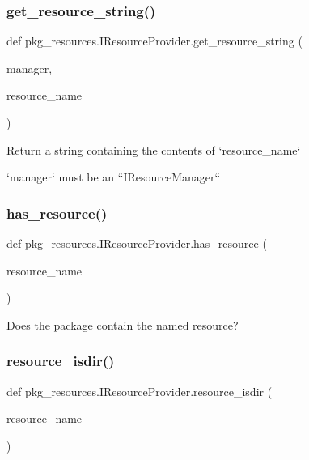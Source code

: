 \subsubsection{\texorpdfstring{get\+\_\+resource\+\_\+string()}{get\_resource\_string()}}
{\footnotesize\ttfamily def pkg\+\_\+resources.\+I\+Resource\+Provider.\+get\+\_\+resource\+\_\+string (\begin{DoxyParamCaption}\item[{}]{manager,  }\item[{}]{resource\+\_\+name }\end{DoxyParamCaption})}

\begin{DoxyVerb}Return a string containing the contents of `resource_name`

`manager` must be an ``IResourceManager``\end{DoxyVerb}
 \mbox{\label{classpkg__resources_1_1_i_resource_provider_a3be0ded1d6af19617ec116f70ea16320}} 
\subsubsection{\texorpdfstring{has\+\_\+resource()}{has\_resource()}}
{\footnotesize\ttfamily def pkg\+\_\+resources.\+I\+Resource\+Provider.\+has\+\_\+resource (\begin{DoxyParamCaption}\item[{}]{resource\+\_\+name }\end{DoxyParamCaption})}

\begin{DoxyVerb}Does the package contain the named resource?\end{DoxyVerb}
 \mbox{\label{classpkg__resources_1_1_i_resource_provider_a02156b99af212145832c8b41b9448499}} 
\subsubsection{\texorpdfstring{resource\+\_\+isdir()}{resource\_isdir()}}
{\footnotesize\ttfamily def pkg\+\_\+resources.\+I\+Resource\+Provider.\+resource\+\_\+isdir (\begin{DoxyParamCaption}\item[{}]{resource\+\_\+name }\end{DoxyParamCaption})}

